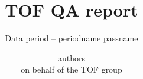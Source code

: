 \title[TOF QA]{ {\Huge TOF QA report} } %
\subtitle{\Large Data period -- {{ periodname }} {{ passname }} } %

\author[ {{ presenter }}]{
  {{ authors }}\\
  on behalf of the TOF group
} %





{
  \centering
  \begin{frame}
    \maketitle
  \end{frame}
}
